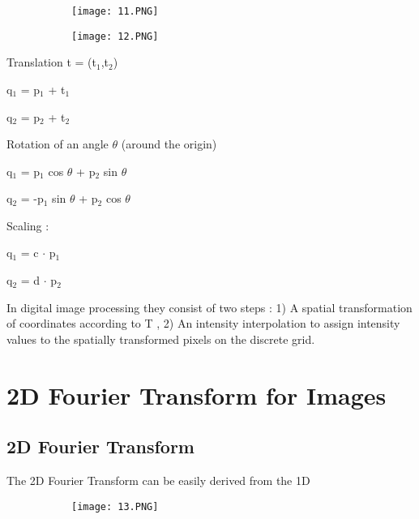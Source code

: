 \documentclass{article}
\begin{document}
 \begin{figure}[ht!]
  \centering
  \begin{subfigure}[b]{0.5\linewidth}
    \texttt{[image: 11.PNG]}
  \end{subfigure}
     \begin{subfigure}[b]{0.49\textwidth}
         \centering
         \texttt{[image: 12.PNG]}
     \end{subfigure}
\end{figure}

Translation t = (t$_1$,t$_2$)
\begin{center}
q$_1$ = p$_1$ + t$_1$
\end{center}
\begin{center}
 q$_2$ = p$_2$ + t$_2$  
\end{center}
Rotation of an angle $\theta$ (around the origin)
\begin{center}
q$_1$ = p$_1$ cos $\theta$ + p$_2$ sin $\theta$   
\end{center}
\begin{center}
q$_2$ = -p$_1$ sin $\theta$ + p$_2$  cos $\theta$   
\end{center}

Scaling :
\begin{center}
q$_1$ = c $\cdot$ p$_1$    
\end{center}
\begin{center}
q$_2$ = d $\cdot$ p$_2$   
\end{center}

In digital image processing they consist of two steps : 1) A spatial transformation of coordinates according to T , 2) An intensity interpolation to assign intensity values to the spatially transformed pixels on the discrete grid.

\vspace{30mm}

\section{2D Fourier Transform for Images}

\subsection{2D Fourier Transform}
\vspace{2mm}
The 2D Fourier Transform can be easily derived from the 1D 

 \begin{figure}[ht!]
  \centering
  \begin{subfigure}[b]{0.7\linewidth}
    \texttt{[image: 13.PNG]}
  \end{subfigure}
\end{figure}
\end{document}
